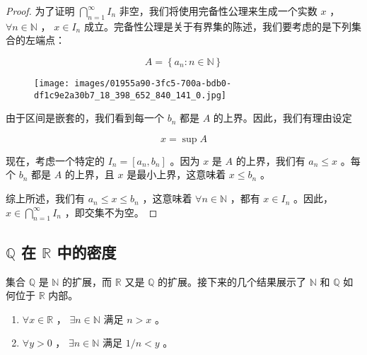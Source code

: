 \begin{proof}
为了证明 \(\mathop{\bigcap }\limits_{{n = 1}}^{\infty }{I}_{n}\) 非空，我们将使用完备性公理来生成一个实数 \(x\) ， \(\forall n \in  \mathbb{N}\) ， \(x \in  {I}_{n}\) 成立。完备性公理是关于有界集的陈述，我们要考虑的是下列集合的左端点：

\[
A = \left\{  {{a}_{n} : n \in  \mathbb{N}}\right\}
\]


\begin{figure}[h]
  \centering
  \texttt{[image: images/01955a90-3fc5-700a-bdb0-df1c9e2a30b7\_18\_398\_652\_840\_141\_0.jpg]}
\end{figure}

由于区间是嵌套的，我们看到每一个 \({b}_{n}\) 都是 \(A\) 的上界。因此，我们有理由设定

\[
x = \sup A
\]

现在，考虑一个特定的 \({I}_{n} = \left\lbrack  {{a}_{n},{b}_{n}}\right\rbrack\) 。因为 \(x\) 是 \(A\) 的上界，我们有 \({a}_{n} \leq  x\) 。每个 \({b}_{n}\) 都是 \(A\) 的上界，且 \(x\) 是最小上界，这意味着 \(x \leq  {b}_{n}\) 。

综上所述，我们有 \({a}_{n} \leq  x \leq  {b}_{n}\) ，这意味着 \(\forall n \in  \mathbb{N}\) ，都有 \(x \in  {I}_{n}\) 。因此， \(x \in  \mathop{\bigcap }\limits_{{n = 1}}^{\infty }{I}_{n}\) ，即交集不为空。  
\end{proof}

\subsection{\(\mathbb{Q}\) 在 \(\mathbb{R}\) 中的密度}

集合 \(\mathbb{Q}\) 是 \(\mathbb{N}\) 的扩展，而 \(\mathbb{R}\) 又是 \(\mathbb{Q}\) 的扩展。接下来的几个结果展示了 \(\mathbb{N}\) 和 \(\mathbb{Q}\) 如何位于 \(\mathbb{R}\) 内部。

\begin{Thm}[Archimedes性]
  \label{thm:1.4.2}
  \begin{enumerate}[label = (\roman*)]
  \item\label{item:1.4.1} \(\forall x \in  \mathbb{R}\) ， \(\exists n \in  \mathbb{N}\) 满足 \(n > x\) 。
  \item \label{item:1.4.2 } \(\forall y > 0\) ， \(\exists n \in  \mathbb{N}\) 满足 \(1/n < y\) 。
  \end{enumerate}
\end{Thm}

